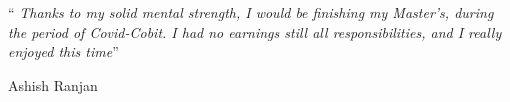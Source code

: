 \documentclass[
11pt, %
english, %
singlespacing, %
liststotoc, %
headsepline, %
]{MastersDoctoralThesis} %
\begin{document}
\cleardoublepage


\vspace*{0.2\textheight}

\noindent\enquote{\itshape 
Thanks to my solid mental strength, 
I would be finishing my Master's, 
during the period of Covid-Cobit. 
I had no earnings still all responsibilities, 
and I really enjoyed this time}\bigbreak

\hfill Ashish Ranjan


%

%


%

\end{document}
